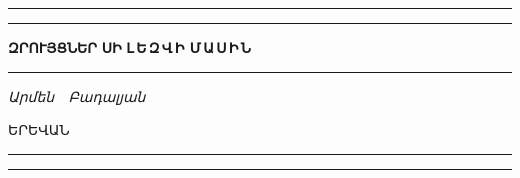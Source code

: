 
\begin{titlepage}
\begingroup
\newlength\drop {}\textheight

\setlength{\parindent}{0pt}

\rule{\textwidth}{1pt}\par
\vspace{2pt}\vspace{-\baselineskip}
\rule{\textwidth}{0.4pt}\par

\vspace\drop
\centering

{\fontsize{42}{42}\selectfont\textbf{Զ\;Ր\;ՈՒ\;Յ\;Ց\;Ն\;Ե\;Ր}}
\null\vskip12pt\null
{\fontsize{64}{64}\selectfont\textbf{Ս\;Ի}}
\null\vskip12pt\null
{\fontsize{32}{32}\selectfont\textbf{Լ\,Ե\,Զ\,Վ\,Ի\; Մ\,Ա\,Ս\,Ի\,Ն}}

\vspace{0.25\drop}
\rule{0.3\textwidth}{0.4pt}\par
\vspace{\drop}

{\Large \textit{Արմեն~~Բադալյան}}

\vfill

ԵՐԵՎԱՆ

\MakeUppercase{}

\rule{\textwidth}{0.4pt}\par
\vspace{2pt}\vspace{-\baselineskip}
\rule{\textwidth}{1pt}\par

\endgroup

\end{titlepage}
